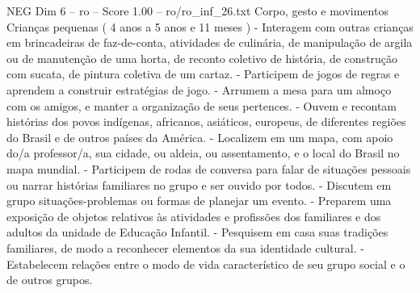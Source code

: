 \begin{textsample}{NEG Dim 6 – ro – Score 1.00 – ro/ro\_inf\_26.txt}  \label{ex:f6_neg_157}
Corpo, gesto e movimentos Crianças pequenas ( 4 anos a 5 anos e 11 meses ) - Interagem com outras crianças em brincadeiras de faz-de-conta, atividades de culinária, de manipulação de argila ou de manutenção de uma horta, de reconto coletivo de história, de construção com sucata, de pintura coletiva de um cartaz. - Participem de jogos de regras e aprendem a construir estratégias de jogo. - Arrumem a mesa para um almoço com os amigos, e manter a organização de seus pertences. - Ouvem e recontam histórias dos povos indígenas, africanos, asiáticos, europeus, de diferentes regiões do Brasil e de outros países da América. - Localizem em um mapa, com apoio do/a professor/a, sua cidade, ou aldeia, ou assentamento, e o local do Brasil no mapa mundial. - Participem de rodas de conversa para falar de situações pessoais ou narrar histórias familiares no grupo e ser ouvido por todos. - Discutem em grupo situações-problemas ou formas de planejar um evento. - Preparem uma exposição de objetos relativos às atividades e profissões dos familiares e dos adultos da unidade de Educação Infantil. - Pesquisem em casa suas tradições familiares, de modo a reconhecer elementos da sua identidade cultural. - Estabelecem relações entre o modo de vida característico de seu grupo social e o de outros grupos.

\end{textsample}
